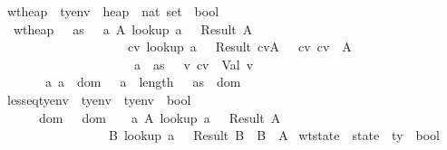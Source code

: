 \begin{isabellebody}
\isanewline
{}\isamarkupfalse \ wt{\isacharunderscore}heap\ {\isacharcolon}{\isacharcolon}\ {\isachardoublequoteopen}ty{\isacharunderscore}env\ {\isasymRightarrow}\ heap\ {\isasymRightarrow}\ nat\ set\ {\isasymRightarrow}\ bool{\isachardoublequoteclose}\ \isanewline
\ \ {\isachardoublequoteopen}wt{\isacharunderscore}heap\ {\isasymSigma}\ {\isasymmu}\ as\ {\isasymequiv}\ {\isacharparenleft}{\isasymforall}\ a\ A{\isachardot}\ lookup\ a\ {\isasymSigma}\ {\isacharequal}\ Result\ A\ {\isasymlongrightarrow}\isanewline
\ \ \ \ \ \ \ \ \ \ \ \ \ \ \ \ \ \ \ {\isacharparenleft}{\isasymexists}\ cv{\isachardot}\ lookup\ a\ {\isasymmu}\ {\isacharequal}\ Result\ {\isacharparenleft}cv{\isacharcomma}A{\isacharparenright}\ {\isasymand}\ {\isasymSigma}\ {\isasymturnstile}cv\ cv\ {\isacharcolon}\ A\ {\isasymand}\isanewline
\ \ \ \ \ \ \ \ \ \ \ \ \ \ \ \ \ \ \ \ \ {\isacharparenleft}a\ {\isasymnotin}\ as\ {\isasymlongrightarrow}\ {\isacharparenleft}{\isasymexists}\ v{\isachardot}\ cv\ {\isacharequal}\ Val\ v{\isacharparenright}{\isacharparenright}{\isacharparenright}{\isacharparenright}\isanewline
\ \ \ \ \ {\isasymand}\ {\isacharparenleft}{\isasymforall}\ a{\isachardot}\ a\ {\isasymin}\ dom\ {\isasymmu}\ {\isasymlongrightarrow}\ a\ {\isacharless}\ length\ {\isasymmu}{\isacharparenright}\ {\isasymand}\ {\isacharparenleft}as\ {\isasymsubseteq}\ dom\ {\isasymSigma}{\isacharparenright}{\isachardoublequoteclose}\isanewline
\isanewline
{}\isamarkupfalse \ lesseq{\isacharunderscore}tyenv\ {\isacharcolon}{\isacharcolon}\ {\isachardoublequoteopen}ty{\isacharunderscore}env\ {\isasymRightarrow}\ ty{\isacharunderscore}env\ {\isasymRightarrow}\ bool{\isachardoublequoteclose}\ {\isacharparenleft}\ {\isachardoublequoteopen}{\isasymsqsubseteq}{\isachardoublequoteclose}\ {}{}{\isacharparenright}\ \isanewline
\ \ {\isachardoublequoteopen}{\isasymSigma}{\isacharprime}\ {\isasymsqsubseteq}\ {\isasymSigma}\ {\isasymequiv}\ {\isacharparenleft}dom\ {\isasymSigma}\ {\isacharequal}\ dom\ {\isasymSigma}{\isacharprime}{\isacharparenright}\ {\isasymand}\ {\isacharparenleft}{\isasymforall}\ a\ A{\isachardot}\ lookup\ a\ {\isasymSigma}\ {\isacharequal}\ Result\ A\ {\isasymlongrightarrow}\isanewline
\ \ \ \ \ \ \ \ \ \ \ \ \ \ \ \ {\isacharparenleft}{\isasymexists}\ B{\isachardot}\ lookup\ a\ {\isasymSigma}{\isacharprime}\ {\isacharequal}\ Result\ B\ {\isasymand}\ B\ {\isasymsqsubseteq}\ A{\isacharparenright}{\isacharparenright}{\isachardoublequoteclose}\isanewline
\isanewline
{}\isamarkupfalse \ wt{\isacharunderscore}state\ {\isacharcolon}{\isacharcolon}\ {\isachardoublequoteopen}state\ {\isasymRightarrow}\ ty\ {\isasymRightarrow}\ bool{\isachardoublequoteclose}\ \isanewline

\end{isabellebody}
